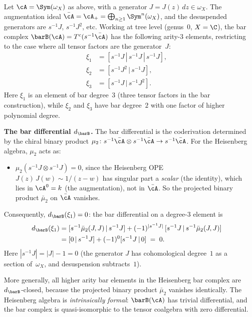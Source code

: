 \begin{example}
\label{ex:heisenberg-bar-3}

Let $\cA = \Sym(\omega_X)$ as above, with a generator
$J = J(z)\,dz \in \omega_X$. The augmentation ideal
$\bar\cA = \cA_+ = \bigoplus_{n \geq 1}\Sym^n(\omega_X)$, and the
desuspended generators are $s^{-1}J$, $s^{-1}J^2$, etc. Working
at tree level (genus~$0$, $X = \C$), the bar complex
$\barB(\cA) = T^c(s^{-1}\bar\cA)$ has the following arity-$3$
elements, restricting to the case where all tensor factors are
the generator~$J$:
\begin{align}
 \xi_1 &= [s^{-1}J \,|\, s^{-1}J \,|\, s^{-1}J],
 \label{eq:heis-bar-el-1}\\
 \xi_2 &= [s^{-1}J^2 \,|\, s^{-1}J],
 \label{eq:heis-bar-el-2}\\
 \xi_3 &= [s^{-1}J \,|\, s^{-1}J^2].
 \label{eq:heis-bar-el-3}
\end{align}
Here $\xi_1$ is an element of bar degree~$3$ (three tensor factors in
the bar construction), while $\xi_2$ and $\xi_3$ have bar degree~$2$
with one factor of higher polynomial degree.

\smallskip\noindent
\textbf{The bar differential $d_{\barB}$.}
The bar differential is the coderivation determined by the chiral
binary product $\mu_2\colon s^{-1}\bar\cA \otimes s^{-1}\bar\cA
\to s^{-1}\bar\cA$. For the Heisenberg algebra, $\mu_2$ acts as:
\begin{itemize}
\item $\mu_2(s^{-1}J \otimes s^{-1}J) = 0$, since the Heisenberg OPE
 $J(z)\,J(w) \sim 1/(z-w)$ has singular part a \emph{scalar}
 (the identity), which lies in $\cA^0 = k$ (the augmentation), not
 in $\bar\cA$. So the projected binary product $\bar\mu_2$ on
 $\bar\cA$ vanishes.
\end{itemize}
Consequently, $d_{\barB}(\xi_1) = 0$: the bar differential on a
degree-$3$ element is
\begin{align*}
 d_{\barB}(\xi_1)
 &= [s^{-1}\bar\mu_2(J,J) \,|\, s^{-1}J]
 + (-1)^{|s^{-1}J|}\,
 [s^{-1}J \,|\, s^{-1}\bar\mu_2(J,J)] \\
 &= [0 \,|\, s^{-1}J] + (-1)^{0} [s^{-1}J \,|\, 0]
 \;=\; 0.
\end{align*}
Here $|s^{-1}J| = |J| - 1 = 0$ (the generator $J$ has cohomological
degree~$1$ as a section of~$\omega_X$, and desuspension subtracts~$1$).

More generally, all higher arity bar elements in the Heisenberg bar
complex are $d_{\barB}$-closed, because the projected binary product
$\bar\mu_2$ vanishes identically. The Heisenberg algebra is
\emph{intrinsically formal}: $\barB(\cA)$ has trivial differential,
and the bar complex is quasi-isomorphic to the tensor coalgebra with
zero differential.


\end{example}

